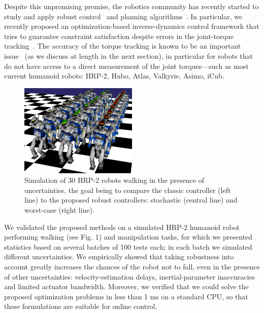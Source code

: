 Despite this unpromising premise, the robotics community has recently started to study and apply robust control~\cite{Brasseur2015, Nguyen} and planning algorithms~\cite{Luo, Mordatch2015}.
In particular, we recently proposed an optimization-based inverse-dynamics control framework that tries to guarantee constraint satisfaction despite errors in the joint-torque tracking~\cite{DelPrete2015b}.
The accuracy of the torque tracking is known to be an important issue~\cite{Boaventura2012b, DelPrete2015a} (as we discuss at length in the next section), in particular for robots that do not have access to a direct measurement of the joint torques---such as most current humanoid robots: HRP-2, Hubo, Atlas, Valkyrie, Asimo, iCub. 
\begin{figure}[htbp]
   \centering
   \includegraphics[width=0.5\textwidth]{figures/30_robots_walking.png} %
   \caption{Simulation of 30 HRP-2 robots walking in the presence of uncertainties, the goal being to compare the classic controller (left line) to the proposed robust controllers: stochastic (central line) and worst-case (right line).}
   \label{fig:robust_TSID}
\end{figure}
We validated the proposed methods on a simulated HRP-2 humanoid robot performing walking (see Fig. 1) and manipulation tasks, for which we presented statistics based on several batches of 100 tests each; in each batch we simulated different uncertainties.
We empirically showed that taking robustness into account greatly increases the chances of the robot not to fall, even in the presence of other uncertainties: velocity-estimation delays, inertial-parameter inaccuracies and limited actuator bandwidth. 
Moreover, we verified that we could solve the proposed optimization problems in less than 1 ms on a standard CPU, so that these formulations are suitable for online control.

